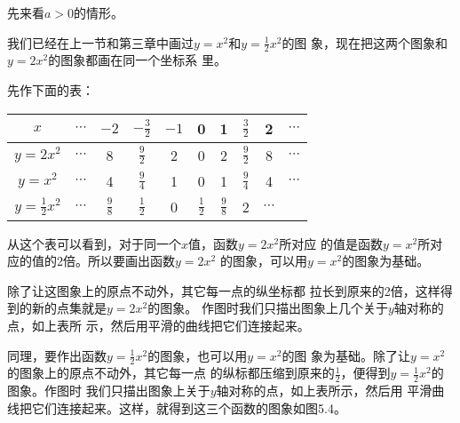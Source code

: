 先来看$a>0$的情形。

我们已经在上一节和第三章中画过$y=x^2$和$y=\frac{1}{2}x^2$的图
象，现在把这两个图象和$y=2x^2$的图象都画在同一个坐标系
里。

先作下面的表：
\begin{center}
\begin{tabular}{c|ccccccccc}
    \hline
$x$ &$\cdots$ & $-2$  & $-\frac{3}{2}$  & $-1$   & 0   & 1&$\frac{3}{2}$& 2&$\cdots$\\
\hline
$y=2x^2$ &$\cdots$ & 8&$\frac{9}{2}$ &2  & 0   & 2&$\frac{9}{2}$ &8&$\cdots$\\
$y=x^2$ &$\cdots$ & 4&$\frac{9}{4}$&1  & 0   & 1&$\frac{9}{4}$&4&$\cdots$\\
$y=\frac{1}{2}x^2$ &$\cdots$ & $\frac{9}{8}$&$\frac{1}{2}$  & 0   & $\frac{1}{2}$  & $\frac{9}{8}$&2&$\cdots$\\
\hline
\end{tabular}    
\end{center}

\begin{figure}[htp]
    \centering
{}
    \caption{}
\end{figure}

从这个表可以看到，对于同一个$x$值，函数$y=2x^2$所对应
的值是函数$y=x^2$所对应的值的2倍。所以要画出函数$y=2x^2$
的图象，可以用$y=x^2$的图象为基础。

除了让这图象上的原点不动外，其它每一点的纵坐标都
拉长到原来的2倍，这样得到的新的点集就是$y=2x^2$的图象。
作图时我们只描出图象上几个关于$y$轴对称的点，如上表所
示，然后用平滑的曲线把它们连接起来。

同理，要作出函数$y=\frac{1}{2}x^2$的图象，也可以用$y=x^2$的图
象为基础。除了让$y=x^2$的图象上的原点不动外，其它每一点
的纵标都压缩到原来的$\frac{1}{2}$，便得到$y=\frac{1}{2}x^2$的图象。作图时
我们只描出图象上关于$y$轴对称的点，如上表所示，然后用
平滑曲线把它们连接起来。这样，就得到这三个函数的图象如图5.4。

